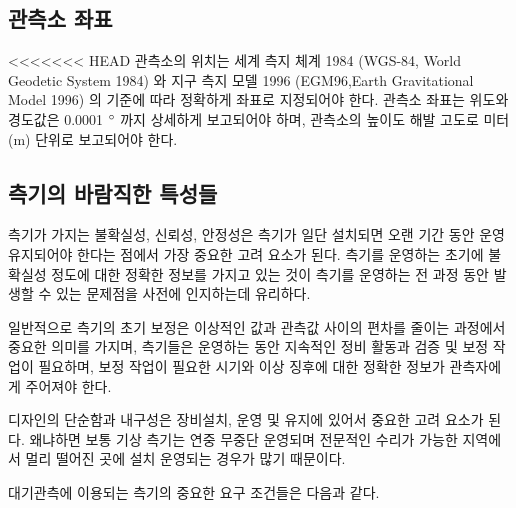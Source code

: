 \subsection{관측소 좌표}
<<<<<<< HEAD
관측소의 위치는 세계 측지 체계 1984 (WGS-84, World Geodetic System 1984) 와 지구 측지 모델 1996 (EGM96,Earth Gravitational Model 1996) 의 기준에 따라 정확하게 좌표로 지정되어야 한다. 관측소 좌표는 위도와 경도값은 0.0001 $\rm ^{\circ}$ 까지 상세하게 보고되어야 하며, 관측소의 높이도 해발 고도로 미터 (m) 단위로 보고되어야 한다.

\subsection{측기의 바람직한 특성들}

측기가 가지는 불확실성, 신뢰성, 안정성은 측기가 일단 설치되면 오랜 기간 동안 운영 유지되어야 한다는 점에서 가장 중요한 고려 요소가 된다. 측기를 운영하는 초기에 불확실성 정도에 대한 정확한 정보를 가지고 있는 것이 측기를 운영하는 전 과정 동안 발생할 수 있는 문제점을 사전에 인지하는데 유리하다.

일반적으로 측기의 초기 보정은 이상적인 값과 관측값 사이의 편차를 줄이는 과정에서 중요한 의미를 가지며, 측기들은 운영하는 동안 지속적인 정비 활동과 검증 및 보정 작업이 필요하며, 보정 작업이 필요한 시기와 이상 징후에 대한 정확한 정보가 관측자에게 주어져야 한다.

디자인의 단순함과 내구성은 장비설치, 운영 및 유지에 있어서 중요한 고려 요소가 된다. 왜냐하면 보통 기상 측기는 연중 무중단 운영되며 전문적인 수리가 가능한 지역에서 멀리 떨어진 곳에 설치 운영되는 경우가 많기 때문이다.

대기관측에 이용되는 측기의 중요한 요구 조건들은 다음과 같다.

